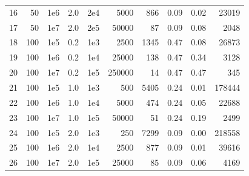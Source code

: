 \documentclass[11pt]{article}
\begin{document}
\begin{table}
\begin{center}
\begin{tabular}{lrrr|rr|rccr}
16 &     50 &    1e6 &    2.0 &  2e4 &     5000 &      866 &      0.09 &         0.02 &    23019 \\
17 &     50 &    1e7 &    2.0 &  2e5 &    50000 &       87 &      0.09 &         0.08 &     2048 \\
18 &    100 &    1e5 &    0.2 &  1e3 &     2500 &     1345 &      0.47 &         0.08 &    26873 \\
19 &    100 &    1e6 &    0.2 &  1e4 &    25000 &      138 &      0.47 &         0.34 &     3128 \\
20 &    100 &    1e7 &    0.2 &  1e5 &   250000 &       14 &      0.47 &         0.47 &      345 \\
21 &    100 &    1e5 &    1.0 &  1e3 &      500 &     5405 &      0.24 &         0.01 &   178444 \\
22 &    100 &    1e6 &    1.0 &  1e4 &     5000 &      474 &      0.24 &         0.05 &    22688 \\
23 &    100 &    1e7 &    1.0 &  1e5 &    50000 &       51 &      0.24 &         0.19 &     2499 \\
24 &    100 &    1e5 &    2.0 &  1e3 &      250 &     7299 &      0.09 &         0.00 &   218558 \\
25 &    100 &    1e6 &    2.0 &  1e4 &     2500 &      877 &      0.09 &         0.01 &    39616 \\
26 &    100 &    1e7 &    2.0 &  1e5 &    25000 &       85 &      0.09 &         0.06 &     4169 \\
\bottomrule
\end{tabular}



\end{center}
\end{table}
\end{document}
